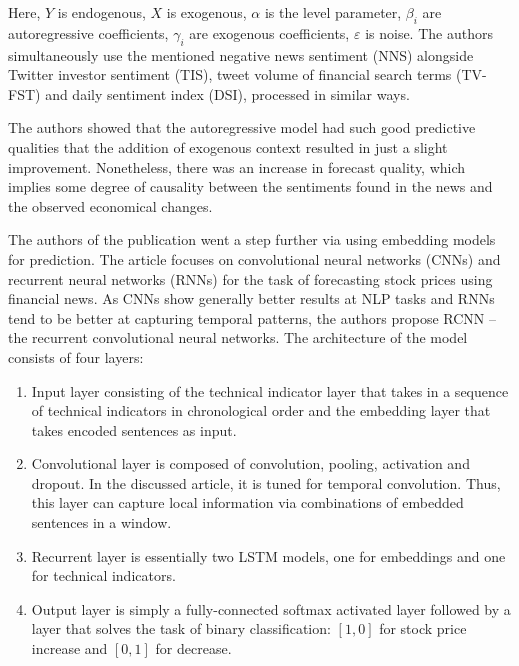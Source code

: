 \documentclass[13pt, a4paper]{article}
\begin{document}
Here, $Y$ is endogenous, $X$ is exogenous, $\alpha$ is the level parameter, $\beta_i$ are autoregressive coefficients, $\gamma_i$ are exogenous coefficients, $\varepsilon$ is noise. The authors simultaneously use the mentioned negative news sentiment (NNS) alongside Twitter investor sentiment (TIS), tweet volume of financial search terms (TV-FST) and daily sentiment index (DSI), processed in similar ways.

The authors showed that the autoregressive model had such good predictive qualities that the addition of exogenous context resulted in just a slight improvement. Nonetheless, there was an increase in forecast quality, which implies some degree of causality between the sentiments found in the news and the observed economical changes. 

The authors of the publication \cite{vargas2017deep} went a step further via using embedding models for prediction. The article focuses on convolutional neural networks (CNNs) and recurrent neural networks (RNNs) for the task of forecasting stock prices using financial news. As CNNs show generally better results at NLP tasks and RNNs tend to be better at capturing temporal patterns, the authors propose RCNN -- the recurrent convolutional neural networks. The architecture of the model consists of four layers:
\begin{enumerate}
	\item Input layer consisting of the technical indicator layer that takes in a sequence of technical indicators in chronological order and the embedding layer that takes encoded sentences as input.
	\item Convolutional layer is composed of convolution, pooling, activation and dropout. In the discussed article, it is tuned for temporal convolution. Thus, this layer can capture local information via combinations of embedded sentences in a window.
	\item Recurrent layer is essentially two LSTM models, one for embeddings and one for technical indicators.
	\item Output layer is simply a fully-connected softmax activated layer followed by a layer that solves the task of binary classification: $[1,0]$ for stock price increase and $[0,1]$ for decrease. 
\end{enumerate}
\end{document}
